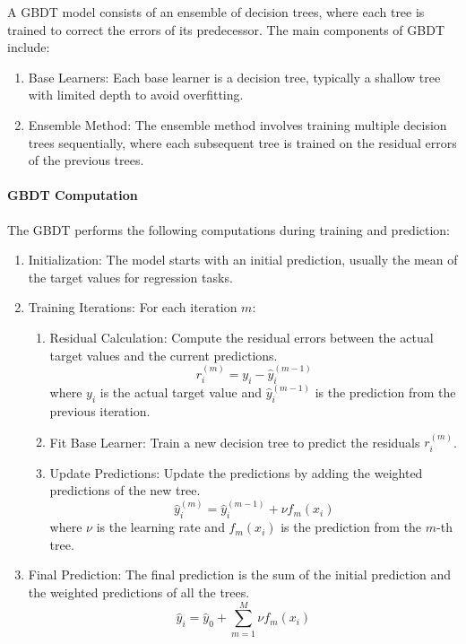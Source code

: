 \documentclass{article}
\begin{document}
    A GBDT model consists of an ensemble of decision trees, where each tree is trained to correct the errors of its predecessor. The main components of GBDT include:

    \begin{enumerate}[label={(\arabic*)}]
        \item {Base Learners}: Each base learner is a decision tree, typically a shallow tree with limited depth to avoid overfitting.
        
        \item {Ensemble Method}: The ensemble method involves training multiple decision trees sequentially, where each subsequent tree is trained on the residual errors of the previous trees.
    \end{enumerate}

    \paragraph{GBDT Computation}

    The GBDT performs the following computations during training and prediction:

    \begin{enumerate}[label={(\arabic*)}]
        \item {Initialization}: The model starts with an initial prediction, usually the mean of the target values for regression tasks.
        
        \item {Training Iterations}: For each iteration $m$:
        \begin{enumerate}
            \item {Residual Calculation}: Compute the residual errors between the actual target values and the current predictions.
            \[
            r_i^{(m)} = y_i - \hat{y}_i^{(m-1)}
            \]
            where $y_i$ is the actual target value and $\hat{y}_i^{(m-1)}$ is the prediction from the previous iteration.
            
            \item {Fit Base Learner}: Train a new decision tree to predict the residuals $r_i^{(m)}$.
            
            \item {Update Predictions}: Update the predictions by adding the weighted predictions of the new tree.
            \[
            \hat{y}_i^{(m)} = \hat{y}_i^{(m-1)} + \nu f_m(x_i)
            \]
            where $\nu$ is the learning rate and $f_m(x_i)$ is the prediction from the $m$-th tree.
        \end{enumerate}
        
        \item {Final Prediction}: The final prediction is the sum of the initial prediction and the weighted predictions of all the trees.
        \[
        \hat{y}_i = \hat{y}_0 + \sum_{m=1}^{M} \nu f_m(x_i)
        \]
    \end{enumerate}
\end{document}
